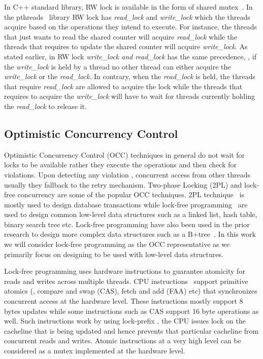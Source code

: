 In C++ standard library, RW lock is available in the form of shared
mutex~\cite{}. In the pthreads~\cite{} library RW lock has \emph{read\_lock} 
and \emph{write\_lock} which the threads acquire based on the operations they intend to
execute. For instance, the threads that just wants to read the shared counter
will acquire \emph{read\_lock} while the threads that requires to update the
shared counter will acquire \emph{write\_lock}. As stated earlier, in RW lock
\emph{write\_lock and read\_lock} has the same precedence, 
\ie, if the \emph{write\_lock} is held by a thread no other thread can 
either acquire the \emph{write\_lock} or the \emph{read\_lock}. In contrary, when
the \emph{read\_lock} is held, the threads that require \emph{read\_lock} are
allowed to acquire the lock while the threads that requires to acquire
the \emph{write\_lock} will have to wait for threads currently holding the
\emph{read\_lock} to release it. 


\subsection{Optimistic Concurrency Control}
\label{s:bg:occ}
Optimistic Concurrency Control (OCC) techniques in general do not wait for locks
to be available rather they execute the operations and then check for
violations. Upon detecting any violation \ie, concurrent access from other
threads usually they fallback to the retry mechanism. Two-phase Locking (2PL)
and lock-free concurrency are some of the popular OCC techniques. 2PL
technique~\cite{} is mostly used to design  database transactions while
lock-free programming~\cite{} are used to design common low-level data
structures such as a linked list, hash table, binary search tree etc. Lock-free
programming have also been used in the prior research to design more complex
data structures such as a B+tree~\cite{}. In this work we will consider
lock-free programming as the OCC representative as we primarily focus on
designing \sys to be used with low-level data structures. 

\label{s:bg:occ:lf}
Lock-free programming uses hardware instructions to guarantee atomicity for
reads and writes across multiple threads. CPU instructions~\cite{} support 
primitive atomics (\eg, compare and swap (CAS), fetch and add (FAA) etc) that synchronizes
concurrent access at the hardware level. These instructions mostly support
8 bytes updates while some instructions such as CAS support 16 byte operations as well. 
Such instructions work by using lock-prefix \ie, the CPU issues lock on the
cacheline that is being updated and hence prevents that particular cacheline
from concurrent reads and writes. Atomic instructions at a very high level can
be considered as a mutex implemented at the hardware level. 


